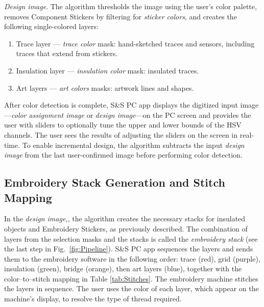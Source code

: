 \textit{Design image}. The algorithm thresholds the image using the user's color palette, removes Component Stickers by filtering for \textit{sticker colors}, and creates the following single-colored layers:
\begin{enumerate}
\itemsep-0.2em 
    \item Trace layer --- \textit{trace color} mask: hand-sketched traces and sensors, including traces that extend from stickers. %
    \item Insulation layer --- \textit{insulation color} mask: insulated traces.
    \item Art layers --- \textit{art colors} masks: artwork lines and shapes.
\end{enumerate}
 

After color detection is complete, S\&S PC app displays the digitized input image---\textit{color assignment image} or \textit{design image}---on the PC screen and provides the user with sliders to optionally tune the upper and lower bounds of the HSV channels. The user sees the results of adjusting the sliders on the screen in real-time. %
To enable incremental design, the algorithm subtracts the input \textit{design image} from the last user-confirmed image before performing color detection.

\subsection{Embroidery Stack Generation and Stitch Mapping}
In the \textit{design image,}, the algorithm creates the necessary stacks for insulated objects and Embroidery Stickers, as previously described. The combination of layers from the selection masks and the stacks is called the \textit{embroidery stack} (see the last step in Fig.\ \ref{fig:Pipeline}). S\&S PC app sequences the layers and sends them to the embroidery software in the following order: trace (red), grid (purple), insulation (green), bridge (orange), then art layers (blue), together with the  color--to--stitch mapping in Table \ref{tab:Stitches}. The embroidery machine stitches the layers in sequence. The user uses the color of each layer, which appear on the machine's display, to resolve the type of thread required.

